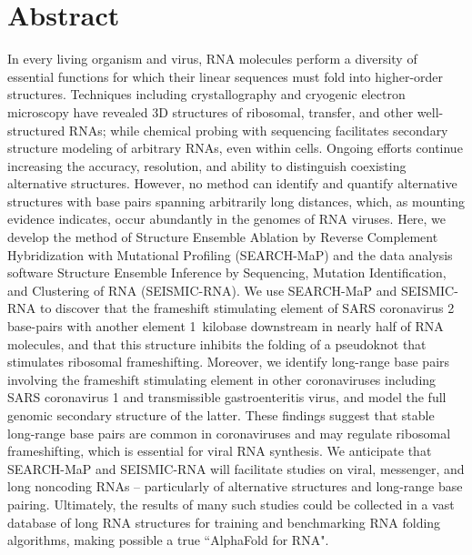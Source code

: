 \documentclass[main.tex]{subfiles}
\begin{document}
\section{Abstract}

In every living organism and virus, RNA molecules perform a diversity of essential functions for which their linear sequences must fold into higher-order structures.
Techniques including crystallography and cryogenic electron microscopy have revealed 3D structures of ribosomal, transfer, and other well-structured RNAs; while chemical probing with sequencing facilitates secondary structure modeling of arbitrary RNAs, even within cells.
Ongoing efforts continue increasing the accuracy, resolution, and ability to distinguish coexisting alternative structures.
However, no method can identify and quantify alternative structures with base pairs spanning arbitrarily long distances, which, as mounting evidence indicates, occur abundantly in the genomes of RNA viruses.
Here, we develop the method of Structure Ensemble Ablation by Reverse Complement Hybridization with Mutational Profiling (SEARCH-MaP) and the data analysis software Structure Ensemble Inference by Sequencing, Mutation Identification, and Clustering of RNA (SEISMIC-RNA).
We use SEARCH-MaP and SEISMIC-RNA to discover that the frameshift stimulating element of SARS coronavirus 2 base-pairs with another element 1~kilobase downstream in nearly half of RNA molecules, and that this structure inhibits the folding of a pseudoknot that stimulates ribosomal frameshifting.
Moreover, we identify long-range base pairs involving the frameshift stimulating element in other coronaviruses including SARS coronavirus 1 and transmissible gastroenteritis virus, and model the full genomic secondary structure of the latter.
These findings suggest that stable long-range base pairs are common in coronaviruses and may regulate ribosomal frameshifting, which is essential for viral RNA synthesis.
We anticipate that SEARCH-MaP and SEISMIC-RNA will facilitate studies on viral, messenger, and long noncoding RNAs -- particularly of alternative structures and long-range base pairing.
Ultimately, the results of many such studies could be collected in a vast database of long RNA structures for training and benchmarking RNA folding algorithms, making possible a true ``AlphaFold for RNA".
\end{document}
